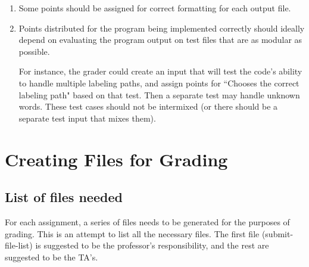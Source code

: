 \documentclass[12pt]{article}
\begin{document}
\begin{enumerate}
\item {Some points should be assigned for correct formatting for each output file.}
 
\item {Points distributed for the program being implemented correctly should ideally depend on evaluating the program output on test files that are as modular as possible.

For instance, the grader could create an input that will test the code's ability to handle multiple labeling paths, and assign points for ``Chooses the correct labeling path" based on that test. Then a separate test may handle unknown words. These test cases should not be intermixed (or there should be a separate test input that mixes them). }
 
\end{enumerate}


\section{Creating Files for Grading} \label{sec:files}

\subsection{List of files needed} \label{sec:fileslist}

For each assignment, a series of files needs to be generated for the purposes of grading. This is an attempt to list all the necessary files. The first file (submit-file-list) is suggested to be the professor's responsibility, and the rest are suggested to be the TA's.
\end{document}
